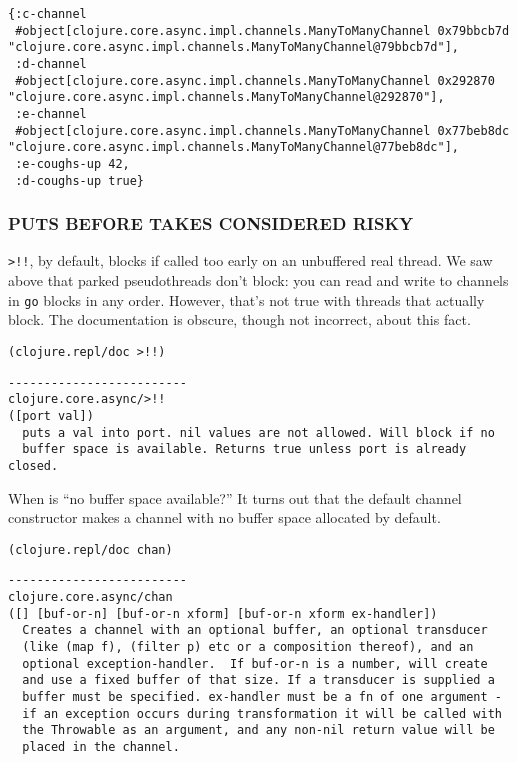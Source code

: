 \documentclass[10pt,oneside,x11names]{article}
\begin{document}
\begin{verbatim}
{:c-channel
 #object[clojure.core.async.impl.channels.ManyToManyChannel 0x79bbcb7d "clojure.core.async.impl.channels.ManyToManyChannel@79bbcb7d"],
 :d-channel
 #object[clojure.core.async.impl.channels.ManyToManyChannel 0x292870 "clojure.core.async.impl.channels.ManyToManyChannel@292870"],
 :e-channel
 #object[clojure.core.async.impl.channels.ManyToManyChannel 0x77beb8dc "clojure.core.async.impl.channels.ManyToManyChannel@77beb8dc"],
 :e-coughs-up 42,
 :d-coughs-up true}
\end{verbatim}

\subsubsection{PUTS BEFORE TAKES CONSIDERED RISKY}
\label{puts-before-takes-considered-risky}
\texttt{>!!}, by default, blocks if called too early on an unbuffered real
thread. We saw above that parked pseudothreads don't block: you can read
and write to channels in \texttt{go} blocks in any order. However, that's not
true with threads that actually block. The documentation is obscure,
though not incorrect, about this fact.

\begin{verbatim}
(clojure.repl/doc >!!)
\end{verbatim}

\begin{verbatim}
-------------------------
clojure.core.async/>!!
([port val])
  puts a val into port. nil values are not allowed. Will block if no
  buffer space is available. Returns true unless port is already closed.
\end{verbatim}


When is ``no buffer space available?'' It turns out that the default
channel constructor makes a channel with no buffer space allocated by
default.

\begin{verbatim}
(clojure.repl/doc chan)
\end{verbatim}

\begin{verbatim}
-------------------------
clojure.core.async/chan
([] [buf-or-n] [buf-or-n xform] [buf-or-n xform ex-handler])
  Creates a channel with an optional buffer, an optional transducer
  (like (map f), (filter p) etc or a composition thereof), and an
  optional exception-handler.  If buf-or-n is a number, will create
  and use a fixed buffer of that size. If a transducer is supplied a
  buffer must be specified. ex-handler must be a fn of one argument -
  if an exception occurs during transformation it will be called with
  the Throwable as an argument, and any non-nil return value will be
  placed in the channel.
\end{verbatim}
\end{document}
